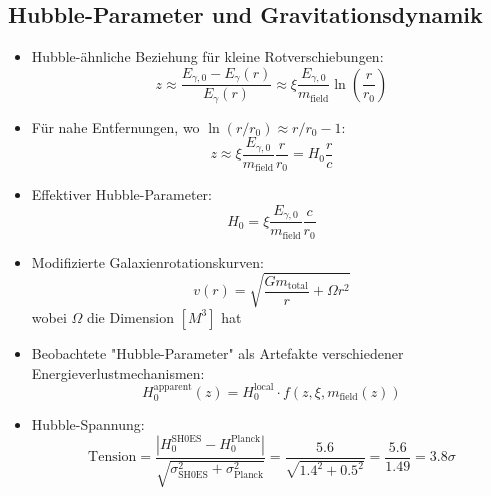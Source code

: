 \documentclass[12pt,a4paper]{article}
\begin{document}
\subsection{Hubble-Parameter und Gravitationsdynamik}
\begin{itemize}
	\item Hubble-ähnliche Beziehung für kleine Rotverschiebungen:
	\begin{equation}
		z \approx \frac{E_{\gamma,0} - E_\gamma(r)}{E_\gamma(r)} \approx \xi \frac{E_{\gamma,0}}{m_{\text{field}}} \ln\left(\frac{r}{r_0}\right)
	\end{equation}
	
	\item Für nahe Entfernungen, wo $\ln(r/r_0) \approx r/r_0 - 1$:
	\begin{equation}
		z \approx \xi \frac{E_{\gamma,0}}{m_{\text{field}}} \frac{r}{r_0} = H_0 \frac{r}{c}
	\end{equation}
	
	\item Effektiver Hubble-Parameter:
	\begin{equation}
		H_0 = \xi \frac{E_{\gamma,0}}{m_{\text{field}}} \frac{c}{r_0}
	\end{equation}
	
	\item Modifizierte Galaxienrotationskurven:
	\begin{equation}
		v(r) = \sqrt{\frac{Gm_{\text{total}}}{r} + \Omega r^2}
	\end{equation}
	wobei $\Omega$ die Dimension $[M^3]$ hat
	
	\item Beobachtete "Hubble-Parameter" als Artefakte verschiedener Energieverlustmechanismen:
	\begin{equation}
		H_0^{\text{apparent}}(z) = H_0^{\text{local}} \cdot f(z, \xi, m_{\text{field}}(z))
	\end{equation}
	
	\item Hubble-Spannung:
	\begin{equation}
		\text{Tension} = \frac{|H_0^{\text{SH0ES}} - H_0^{\text{Planck}}|}{\sqrt{\sigma_{\text{SH0ES}}^2 + \sigma_{\text{Planck}}^2}} = \frac{5.6}{\sqrt{1.4^2 + 0.5^2}} = \frac{5.6}{1.49} = 3.8\sigma
	\end{equation}
\end{itemize}
\end{document}
